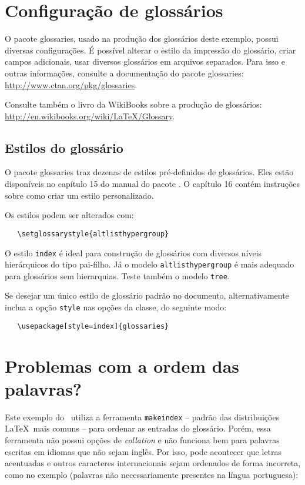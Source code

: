 \documentclass[
    12pt,				%
    openright,			%
    twoside,			%
    a4paper,			%
    english,			%
    french,				%
    spanish,			%
    brazil				%
    ]{abntex2}
\begin{document}
\section{Configuração de glossários}

O pacote \textsf{glossaries}, usado na produção dos glossários deste exemplo,
possui diversas configurações. É possível alterar o estilo da impressão do
glossário, criar campos adicionais, usar diversos glossários em
arquivos separados. Para isso e outras informações, consulte a documentação do
pacote \textsf{glossaries}: \url{http://www.ctan.org/pkg/glossaries}.

Consulte também o livro da WikiBooks sobre a produção de glossários:
\url{http://en.wikibooks.org/wiki/LaTeX/Glossary}.
 

\subsection{Estilos do glossário}

O pacote \textsf{glossaries} traz dezenas de estilos pré-definidos de
glossários. Eles estão disponíveis no capítulo 15 do manual do pacote
\cite{talbot2012}. O capítulo 16 contém instruções sobre como criar um estilo
personalizado.

Os estilos podem ser alterados com:

\begin{verbatim}
   \setglossarystyle{altlisthypergroup}
\end{verbatim}

O estilo \texttt{index} é ideal para construção de glossários com diversos
níveis hierárquicos do tipo pai-filho. Já o modelo \texttt{altlisthypergroup} é
mais adequado para glossários sem hierarquias. Teste também o modelo
\texttt{tree}.

Se desejar um único estilo de glossário padrão no documento, alternativamente
inclua a opção \texttt{style} nas opções da classe, do
seguinte modo:

\begin{verbatim}
   \usepackage[style=index]{glossaries}
\end{verbatim}

\section{Problemas com a ordem das palavras?}

Este exemplo do \abnTeX\ utiliza a ferramenta \texttt{makeindex} -- padrão das
distribuições \LaTeX\ mais comuns -- para ordenar as entradas do glossário.
Porém, essa ferramenta não possui opções de \textit{collation} e não funciona
bem para palavras escritas em idiomas que não sejam inglês.
Por isso, pode acontecer que letras acentuadas e outros caracteres
internacionais sejam ordenados de forma incorreta, como no exemplo (palavras não
necessariamente presentes na língua portuguesa):
\end{document}
